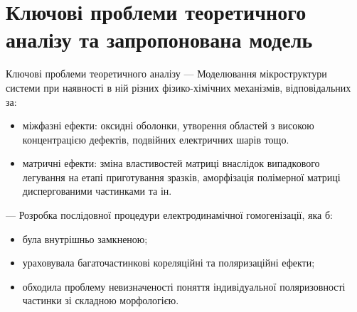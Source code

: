 \documentclass[10pt]{beamer}
\begin{document}
\section{Ключові проблеми теоретичного аналізу та запропонована модель}
\begin{frame}{Ключові проблеми теоретичного аналізу}
--- Моделювання мікроструктури системи при наявності в ній різних фізико-хімічних механізмів, відповідальних за:
\begin{itemize}\footnotesize
    \item міжфазні ефекти: оксидні оболонки, утворення областей з високою концентрацією дефектів, подвійних електричних шарів тощо.
    \item матричні ефекти: зміна властивостей матриці внаслідок випадкового легування на етапі приготування зразків, аморфізація полімерної матриці диспергованими частинками та ін.
\end{itemize}

--- Розробка послідовної процедури електродинамічної гомогенізації, яка б:
  
\begin{itemize}\footnotesize
    \item була внутрішньо замкненою;
    \item ураховувала  багаточастинкові кореляційні та поляризаційні ефекти;
    \item обходила проблему невизначеності поняття індивідуальної поляризовності частинки зі складною морфологією.
\end{itemize}

\end{frame}
\end{document}
